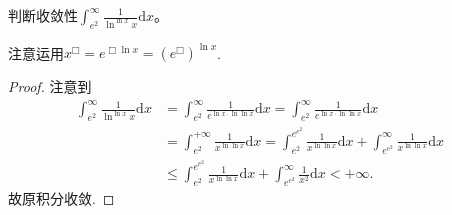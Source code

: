 \documentclass[../../main.tex]{subfiles}
\begin{document}
\begin{example}
判断收敛性\(\int_{e^2}^{\infty}\frac{1}{\ln^{\ln x}x}\mathrm{d}x\)。 
\end{example}
\begin{note}
注意运用\(x^{\Box}=e^{\Box\ln x}=(e^{\Box})^{\ln x}\).
\end{note}
\begin{proof}
注意到
\begin{align*}
\int_{e^2}^{\infty}\frac{1}{\ln^{\ln x}x}\mathrm{d}x&=\int_{e^2}^{\infty}\frac{1}{e^{\ln x\cdot \ln\ln x}}\mathrm{d}x=\int_{e^2}^{\infty}\frac{1}{e^{\ln x\cdot \ln\ln x}}\mathrm{d}x\\
&=\int_{e^2}^{+\infty}\frac{1}{x^{\ln\ln x}}\mathrm{d}x=\int_{e^2}^{e^{e^2}}\frac{1}{x^{\ln\ln x}}\mathrm{d}x+\int_{e^{e^2}}^{\infty}\frac{1}{x^{\ln\ln x}}\mathrm{d}x\\
&\leqslant \int_{e^2}^{e^{e^2}}\frac{1}{x^{\ln\ln x}}\mathrm{d}x+\int_{e^{e^2}}^{\infty}\frac{1}{x^2}\mathrm{d}x<+\infty.
\end{align*}
故原积分收敛. 
\end{proof}
\end{document}
